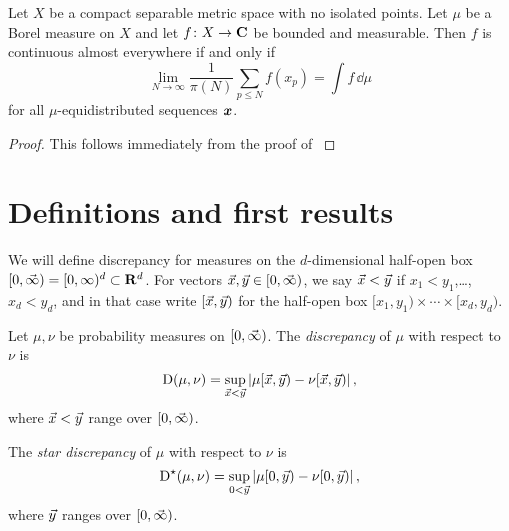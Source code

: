 \begin{theorem}
Let $X$ be a compact separable metric space with no isolated points. Let $\mu$ 
be a Borel measure on $X$ and let $f\colon X\to \mathbf{C}$ be bounded and measurable. 
Then $f$ is continuous almost everywhere if and only if 
\[
	\lim_{N\to \infty} \frac{1}{\pi(N)} \sum_{p\leqslant N} f(x_p) = \int f\, \dd\mu
\]
for all $\mu$-equidistributed sequences ${\boldsymbol x}$. 
\end{theorem}
\begin{proof}
This follows immediately from the proof of \cite[Th.~1]{mazzone-1995}
\end{proof}





\section{Definitions and first results}

We will define discrepancy for measures on the $d$-dimensional half-open box 
$[0,\vec{\infty}) = [0,\infty)^d\subset \mathbf{R}^d$. For vectors 
$\vec{x},\vec{y}\in [0,\vec{\infty})$, we say $\vec{x}<\vec{y}$ if $x_1<y_1$,\dots,$x_d<y_d$, and 
in that case write $[\vec{x},\vec{y})$ for the half-open box 
$[x_1,y_1)\times \cdots \times [x_d,y_d)$. 

\begin{definition}
Let $\mu, \nu$ be probability measures on $[0,\vec{\infty})$. The 
\emph{discrepancy} of $\mu$ with respect to $\nu$ is 
\[
	\operatorname{D}(\mu,\nu) = \sup_{\vec{x} < \vec{y}} \left| \mu[\vec{x},\vec{y}) - \nu[\vec{x},\vec{y})\right| ,
\]
where $\vec{x}<\vec{y}$ range over $[0,\vec{\infty})$.

The \emph{star discrepancy} of $\mu$ with respect to $\nu$ is 
\[
	\operatorname{D}^\star(\mu,\nu) = \sup_{0<\vec{y}} \left| \mu[0,\vec{y}) - \nu[0,\vec{y})\right| ,
\]
where $\vec{y}$ ranges over $[0,\vec{\infty})$. 
\end{definition}

